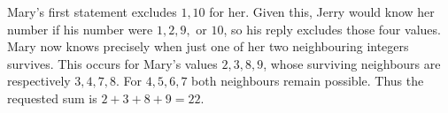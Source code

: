 Mary's first statement excludes $1,10$ for her. Given this, Jerry would know her number if his number were $1,2,9,$ or $10$, so his reply excludes those four values. Mary now knows precisely when just one of her two neighbouring integers survives. This occurs for Mary's values $2,3,8,9$, whose surviving neighbours are respectively $3,4,7,8$. For $4,5,6,7$ both neighbours remain possible. Thus the requested sum is $2+3+8+9=\boxed{22}$.
